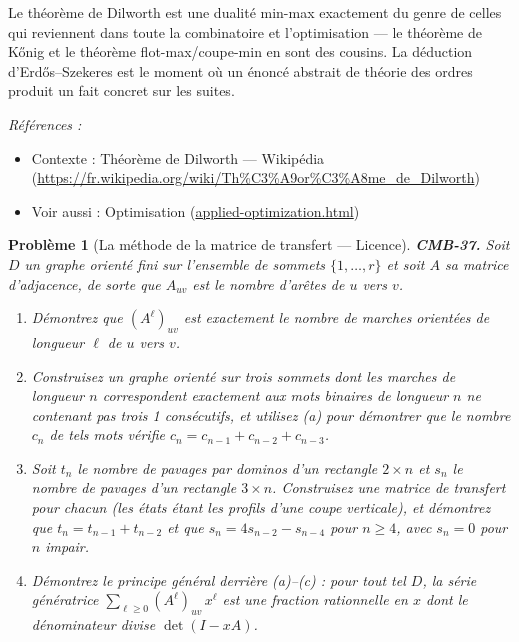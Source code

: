 \documentclass[11pt]{article}
\newtheorem{problem}{Problème}
\newenvironment{refs}{\par\small\noindent\emph{Références :}\begin{itemize}\setlength\itemsep{0pt}}{\end{itemize}\normalsize}
\begin{document}
\noindent Le théorème de Dilworth est une dualité min-max exactement du genre de celles qui reviennent dans toute la combinatoire et l'optimisation --- le théorème de K\H{o}nig et le théorème flot-max/coupe-min en sont des cousins. La déduction d'Erd\H{o}s--Szekeres est le moment où un énoncé abstrait de théorie des ordres produit un fait concret sur les suites.

\begin{refs}
\item Contexte : Théorème de Dilworth --- Wikipédia (\url{https://fr.wikipedia.org/wiki/Th%C3%A9or%C3%A8me_de_Dilworth})
\item Voir aussi : Optimisation (\url{applied-optimization.html})
\end{refs}

\bigskip

\begin{problem}[{La méthode de la matrice de transfert --- Licence}]
\textbf{CMB-37.} Soit $ D $ un graphe orienté fini sur l'ensemble de sommets $ \{1,\dots,r\} $ et soit $ A $ sa matrice d'adjacence, de sorte que $ A_{uv} $ est le nombre d'arêtes de $ u $ vers $ v $.
\begin{enumerate}
\item[(a)] Démontrez que $ (A^{\ell})_{uv} $ est exactement le nombre de marches orientées de longueur $ \ell $ de $ u $ vers $ v $.
\item[(b)] Construisez un graphe orienté sur trois sommets dont les marches de longueur $ n $ correspondent exactement aux mots binaires de longueur $ n $ ne contenant pas trois 1 consécutifs, et utilisez (a) pour démontrer que le nombre $ c_n $ de tels mots vérifie $ c_n = c_{n-1} + c_{n-2} + c_{n-3} $.
\item[(c)] Soit $ t_n $ le nombre de pavages par dominos d'un rectangle $ 2 \times n $ et $ s_n $ le nombre de pavages d'un rectangle $ 3 \times n $. Construisez une matrice de transfert pour chacun (les états étant les profils d'une coupe verticale), et démontrez que $ t_n = t_{n-1} + t_{n-2} $ et que $ s_n = 4 s_{n-2} - s_{n-4} $ pour $ n \ge 4 $, avec $ s_n = 0 $ pour $ n $ impair.
\item[(d)] Démontrez le principe général derrière (a)--(c) : pour tout tel $ D $, la série génératrice $ \sum_{\ell \ge 0} (A^{\ell})_{uv}\, x^{\ell} $ est une fraction rationnelle en $ x $ dont le dénominateur divise $ \det(I - xA) $.
\end{enumerate}

\end{problem}
\end{document}
